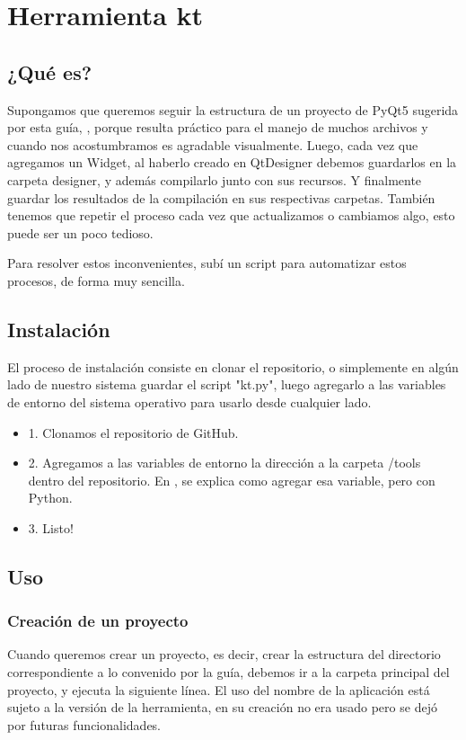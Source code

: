 \section{Herramienta kt}

\subsection{¿Qu\'e es?}
Supongamos que queremos seguir la estructura de un proyecto de PyQt5 sugerida por esta gu\'ia, , porque resulta pr\'actico
para el manejo de muchos archivos y cuando nos acostumbramos es agradable visualmente. Luego, cada vez que agregamos un Widget, al haberlo creado en QtDesigner debemos
guardarlos en la carpeta designer, y adem\'as compilarlo junto con sus recursos. Y finalmente guardar los resultados de la compilaci\'on en sus respectivas carpetas.
Tambi\'en tenemos que repetir el proceso cada vez que actualizamos o cambiamos algo, esto puede ser un poco tedioso.

Para resolver estos inconvenientes, sub\'i un script para automatizar estos procesos, de forma muy sencilla.

\subsection{Instalaci\'on}
El proceso de instalaci\'on consiste en clonar el repositorio, o simplemente en alg\'un lado de nuestro sistema guardar el script "kt.py", luego
agregarlo a las variables de entorno del sistema operativo para usarlo desde cualquier lado.

\begin{itemize}
    \item 1. Clonamos el repositorio de GitHub.
    \item 2. Agregamos a las variables de entorno la direcci\'on a la carpeta /tools dentro del repositorio. En , se explica como agregar esa variable, pero con Python.
    \item 3. Listo!
\end{itemize}

\subsection{Uso}

\subsubsection{Creaci\'on de un proyecto}
Cuando queremos crear un proyecto, es decir, crear la estructura del directorio correspondiente a lo convenido por la gu\'ia,
debemos ir a la carpeta principal del proyecto, y ejecuta la siguiente l\'inea. El uso del nombre de la aplicaci\'on est\'a sujeto a la versi\'on
de la herramienta, en su creaci\'on no era usado pero se dej\'o por futuras funcionalidades.

